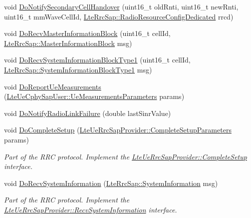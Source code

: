 \begin{DoxyCompactItemize}
\item 
void \hyperlink{classns3_1_1LteUeRrc_a267060251aa6f801b7b1b1b69b7aa889}{Do\+Notify\+Secondary\+Cell\+Handover} (uint16\+\_\+t old\+Rnti, uint16\+\_\+t new\+Rnti, uint16\+\_\+t mm\+Wave\+Cell\+Id, \hyperlink{structns3_1_1LteRrcSap_1_1RadioResourceConfigDedicated}{Lte\+Rrc\+Sap\+::\+Radio\+Resource\+Config\+Dedicated} rrcd)
\item 
void \hyperlink{classns3_1_1LteUeRrc_aaba9572f8e8227b56838646bed0b0e5f}{Do\+Recv\+Master\+Information\+Block} (uint16\+\_\+t cell\+Id, \hyperlink{structns3_1_1LteRrcSap_1_1MasterInformationBlock}{Lte\+Rrc\+Sap\+::\+Master\+Information\+Block} msg)
\item 
void \hyperlink{classns3_1_1LteUeRrc_ac2bfb65275f3d4aac6564ab91ac765d1}{Do\+Recv\+System\+Information\+Block\+Type1} (uint16\+\_\+t cell\+Id, \hyperlink{structns3_1_1LteRrcSap_1_1SystemInformationBlockType1}{Lte\+Rrc\+Sap\+::\+System\+Information\+Block\+Type1} msg)
\item 
void \hyperlink{classns3_1_1LteUeRrc_a95f2a735a6762703344d1d829d7df5db}{Do\+Report\+Ue\+Measurements} (\hyperlink{structns3_1_1LteUeCphySapUser_1_1UeMeasurementsParameters}{Lte\+Ue\+Cphy\+Sap\+User\+::\+Ue\+Measurements\+Parameters} params)
\item 
void \hyperlink{classns3_1_1LteUeRrc_aed693d1940c12ebb39721866db9bd9c2}{Do\+Notify\+Radio\+Link\+Failure} (double last\+Sinr\+Value)
\item 
void \hyperlink{classns3_1_1LteUeRrc_a071604e93b77bfe4ac4dfe70bf3d893c}{Do\+Complete\+Setup} (\hyperlink{structns3_1_1LteUeRrcSapProvider_1_1CompleteSetupParameters}{Lte\+Ue\+Rrc\+Sap\+Provider\+::\+Complete\+Setup\+Parameters} params)
\begin{DoxyCompactList}\small\item\em Part of the R\+RC protocol. Implement the \hyperlink{classns3_1_1LteUeRrcSapProvider_a4c1f8cda8a1fcf1f509fa21770da682d}{Lte\+Ue\+Rrc\+Sap\+Provider\+::\+Complete\+Setup} interface. \end{DoxyCompactList}\item 
void \hyperlink{classns3_1_1LteUeRrc_ac42747bda3cd2fb433b17ede5c40a084}{Do\+Recv\+System\+Information} (\hyperlink{structns3_1_1LteRrcSap_1_1SystemInformation}{Lte\+Rrc\+Sap\+::\+System\+Information} msg)
\begin{DoxyCompactList}\small\item\em Part of the R\+RC protocol. Implement the \hyperlink{classns3_1_1LteUeRrcSapProvider_a34d16c5adabf7ee0caf111fd2b6bfbd3}{Lte\+Ue\+Rrc\+Sap\+Provider\+::\+Recv\+System\+Information} interface. \end{DoxyCompactList}\item 

\end{DoxyCompactItemize}
